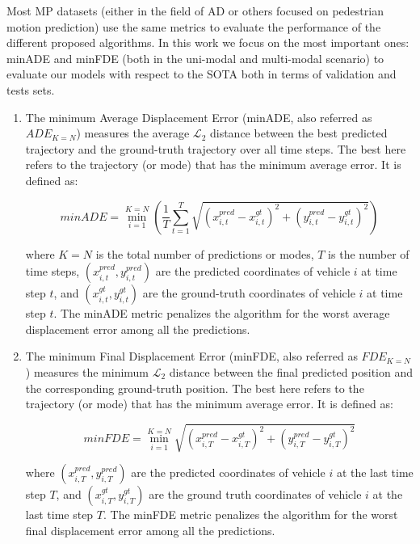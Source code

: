Most \ac{MP} datasets (either in the field of \ac{AD} or others focused on pedestrian motion prediction) use the same metrics to evaluate the performance of the different proposed algorithms. In this work we focus on the most important ones: \ac{minADE} and \ac{minFDE} (both in the uni-modal and multi-modal scenario) to evaluate our models with respect to the \ac{SOTA} both in terms of validation and tests sets.

\begin{enumerate}
	
	\item The minimum Average Displacement Error (minADE, also referred as $ADE_{K=N}$) measures the average $\mathcal{L}_2$ distance between the best predicted trajectory and the ground-truth trajectory over all time steps. The best here refers to the trajectory (or mode) that has the minimum average error. It is defined as:
	
	\[
	minADE = \min_{i=1}^{K=N} \left( \frac{1}{T}\sum_{t=1}^{T}\sqrt{{(x_{i,t}^{pred} - x_{i,t}^{gt})}^2 + {(y_{i,t}^{pred} - y_{i,t}^{gt})}^2} \right)
	\]
	
	where $K=N$ is the total number of predictions or modes, $T$ is the number of time steps, $(x_{i,t}^{pred}, y_{i,t}^{pred})$ are the predicted coordinates of vehicle $i$ at time step $t$, and $(x_{i,t}^{gt}, y_{i,t}^{gt})$ are the ground-truth coordinates of vehicle $i$ at time step $t$. The \ac{minADE} metric penalizes the algorithm for the worst average displacement error among all the predictions.
	
	\item The minimum Final Displacement Error (minFDE, also referred as $FDE_{K=N}$) measures the minimum $\mathcal{L}_2$ distance between the final predicted position and the corresponding ground-truth position. The best here refers to the trajectory (or mode) that has the minimum average error. It is defined as:
	
	\[
	minFDE = \min_{i=1}^{K=N} \sqrt{{(x_{i,T}^{pred} - x_{i,T}^{gt})}^2 + {(y_{i,T}^{pred} - y_{i,T}^{gt})}^2}
	\]
	
	where $(x_{i,T}^{pred}, y_{i,T}^{pred})$ are the predicted coordinates of vehicle $i$ at the last time step $T$, and $(x_{i,T}^{gt}, y_{i,T}^{gt})$ are the ground truth coordinates of vehicle $i$ at the last time step $T$. The \ac{minFDE} metric penalizes the algorithm for the worst final displacement error among all the predictions.
	
\end{enumerate}

